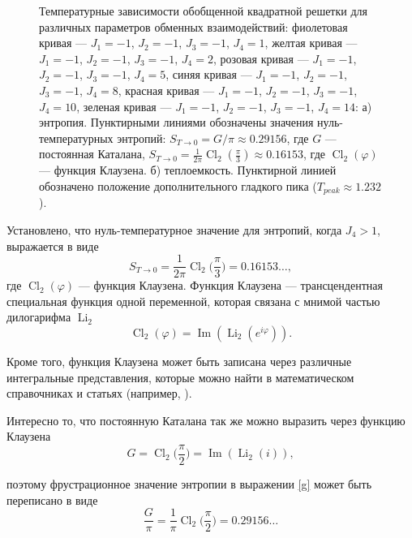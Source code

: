 \documentclass[utf8,12pt]{jetp}
\DeclareMathOperator{\Cl}{Cl}
\DeclareMathOperator{\Li}{Li}
\DeclareMathOperator{\im}{Im}
\begin{document}
\begin{figure}[h]
\begin{minipage}[h]{0.5\linewidth}
	\end{minipage}
	\caption{Температурные зависимости обобщенной квадратной решетки для различных параметров обменных взаимодействий: фиолетовая кривая --- $J_1 = -1$, $J_2 = -1$, $J_3 = -1$, $J_4 = 1$, желтая кривая --- $J_1 = -1$, $J_2 = -1$, $J_3 = -1$, $J_4 = 2$, розовая кривая --- $J_1 = -1$, $J_2 = -1$, $J_3 = -1$, $J_4 = 5$, синяя кривая --- $J_1 = -1$, $J_2 = -1$, $J_3 = -1$, $J_4 = 8$, красная кривая --- $J_1 = -1$, $J_2 = -1$, $J_3 = -1$, $J_4 = 10$, зеленая кривая --- $J_1 = -1$, $J_2 = -1$, $J_3 = -1$, $J_4 = 14$: а) энтропия. Пунктирными линиями обозначены значения нуль-температурных энтропий: $S_{T\rightarrow 0} = G/\pi\approx 0.29156$, где $G$ --- постоянная Каталана, $S_{T\rightarrow 0} = \frac{1}{2\pi} \Cl_2 (\frac{\pi}{3})\approx0.16153$, где $\Cl_2 (\varphi)$ --- функция Клаузена. б) теплоемкость. Пунктирной линией обозначено положение дополнительного гладкого пика ($T_{peak}\approx1.232$). }
	\label{Peak}
\end{figure}

Установлено, что нуль-температурное значение для энтропий, когда $J_4>1$, выражается в виде    
\begin{equation}
S_{T\rightarrow 0} = \frac{1}{2\pi} \Cl_2 \bigg(\frac{\pi}{3}\bigg)   = 0.16153\dots, 
\label{cl}
\end{equation} 
где  $\Cl_2 (\varphi)$ --- функция Клаузена. Функция Клаузена --- трансцендентная специальная функция одной переменной, которая связана с мнимой частью дилогарифма $\Li_2$
\begin{equation*}
\Cl_2 (\varphi) = \im (\Li_2 (e^{i \varphi})).
\end{equation*}

Кроме того, функция Клаузена может быть записана через различные интегральные представления, которые можно найти в математическом справочниках и статьях (например, \cite{abramowitz_stegun1972, wood1968}).

Интересно то, что постоянную Каталана так же можно выразить через функцию Клаузена~\cite{wood1968}
\begin{equation*}
G = \Cl_2 \bigg(\frac{\pi}{2}\bigg) = \im (\Li_2 (i)),
\end{equation*}

\noindent поэтому фрустрационное значение энтропии в выражении \eqref{g} может быть переписано в виде
\begin{equation}
\frac{G}{\pi} = \frac{1}{\pi} \Cl_2 \bigg(\frac{\pi}{2}\bigg) = 0.29156\dots
\end{equation}
\end{document}

